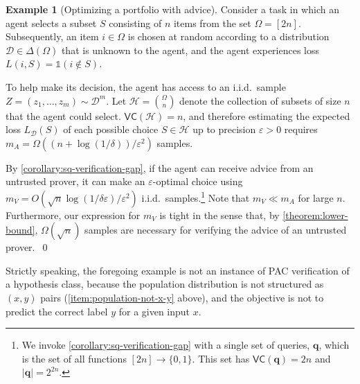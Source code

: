 \documentclass[11pt]{article}
\numberwithin{equation}{section}
\theoremstyle{definition}
\newtheorem{example}[theorem]{Example}
\theoremstyle{plain}
\theoremstyle{definition}\newtheorem{notation}[theorem]{Notation}\theoremstyle{plain}\raggedbottom
\newcommand{\roundBrackets}[1]{
	\mathopen{}\left(#1\right)\mathclose{}
}
\newcommand{\customFunctionRound}[2]{
	#1\roundBrackets{#2}
}
\newcommand{\sfFunction}[2]{
	\customFunctionRound{\mathsf{#1}}{#2}
}
\newcommand{\OmegaOf}[1]{\Omega\roundBrackets{#1}}
\newcommand{\BigO}[1]{O\roundBrackets{#1}}
\newcommand{\distribution}[1]{\Delta\roundBrackets{#1}}
\newcommand{\Loss}[2]{\LossNameEmpty_{#1}\roundBrackets{#2}}
\newcommand{\LossNameEmpty}{L}
\newcommand{\VC}[1]{\sfFunction{VC}{#1}}
\newcommand{\cD}{\mathcal{D}}
\newcommand{\cH}{\mathcal{H}}
\newcommand{\bq}{\mathbf{q}}
\newcommand{\1}{\mathds{1}}
\newcommand{\mA}{m_{\scriptscriptstyle A}}
\newcommand{\mV}{m_{\scriptscriptstyle V}}
\begin{document}
\begin{example}[Optimizing a portfolio with advice]
	Consider a task in which an agent selects a subset $S$ consisting of $n$ items from the set $\Omega = [2n]$. Subsequently, an item $i \in \Omega$ is chosen at random according to a distribution $\cD \in \distribution{\Omega}$ that is unknown to the agent, and the agent experiences loss $L(i,S) = \1(i \notin S)$.
	
	To help make its decision, the agent has access to an i.i.d.\ sample $Z = (z_1,\dots,z_m) \sim \cD^m$. Let $\cH = \binom{\Omega}{n}$ denote the collection of subsets of size $n$ that the agent could select. $\VC{\cH} = n$, and therefore estimating the expected loss $\Loss{\cD}{S}$ of each possible choice $S \in \cH$ up to precision $\varepsilon > 0$ requires $\mA = \OmegaOf{(n + \log(1/\delta))/\varepsilon^2}$ samples.
	
	By \cref{corollary:sq-verification-gap}, if the agent can receive advice from an untrusted prover, it can make an $\varepsilon$-optimal choice using $\mV = \BigO{\sqrt{n}\log(1/\delta\varepsilon)/\varepsilon^2}$ i.i.d.\ samples.\footnote{%
		We invoke \cref{corollary:sq-verification-gap} with a single set of queries, $\bq$, which is the set of all functions $[2n] \to \{0,1\}$. This set has $\VC{\bq} = 2n$ and $|\bq| = 2^{2n}$.
	} Note that $\mV \ll \mA$ for large $n$. Furthermore, our expression for $\mV$ is tight in the sense that, by \cref{theorem:lower-bound}, $\OmegaOf{\sqrt{n}}$ samples are necessary for verifying the advice of an untrusted prover.~\qed
\end{example}

Strictly speaking, the foregoing example is not an instance of PAC verification of a hypothesis class, because the population distribution is not structured as $(x,y)$ pairs (\cref{item:population-not-x-y} above), and the objective is not to predict the correct label $y$ for a given input $x$. 
\end{document}
